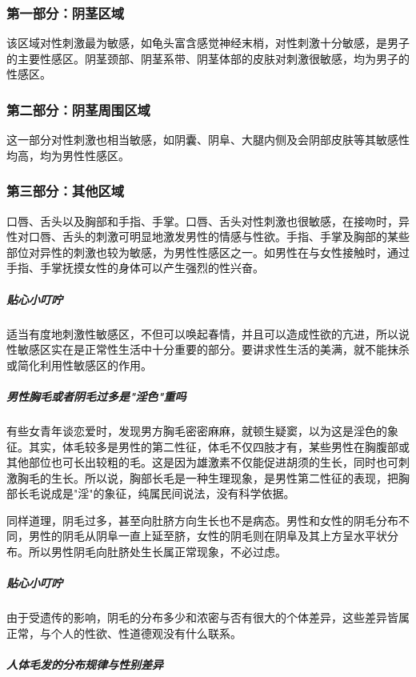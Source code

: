 \begin{enumerate}
\subsubsection{第一部分：阴茎区域}

该区域对性刺激最为敏感，如龟头富含感觉神经末梢，对性刺激十分敏感，是男子的主要性感区。阴茎颈部、阴茎系带、阴茎体部的皮肤对刺激很敏感，均为男子的性感区。

\subsubsection{第二部分：阴茎周围区域}

这一部分对性刺激也相当敏感，如阴囊、阴阜、大腿内侧及会阴部皮肤等其敏感性均高，均为男性性感区。

\subsubsection{第三部分：其他区域}

口唇、舌头以及胸部和手指、手掌。口唇、舌头对性刺激也很敏感，在接吻时，异性对口唇、舌头的刺激可明显地激发男性的情感与性欲。手指、手掌及胸部的某些部位对异性的刺激也较为敏感，为男性性感区之一。如男性在与女性接触时，通过手指、手掌抚摸女性的身体可以产生强烈的性兴奋。

\subparagraph{贴心小叮咛}

适当有度地刺激性敏感区，不但可以唤起春情，并且可以造成性欲的亢进，所以说性敏感区实在是正常性生活中十分重要的部分。要讲求性生活的美满，就不能抹杀或简化利用性敏感区的作用。

\subparagraph{男性胸毛或者阴毛过多是"淫色"重吗}

有些女青年谈恋爱时，发现男方胸毛密密麻麻，就顿生疑窦，以为这是淫色的象征。其实，体毛较多是男性的第二性征，体毛不仅四肢才有，某些男性在胸腹部或其他部位也可长出较粗的毛。这是因为雄激素不仅能促进胡须的生长，同时也可刺激胸毛的生长。所以说，胸部长毛是一种生理现象，是男性第二性征的表现，把胸部长毛说成是"淫"的象征，纯属民间说法，没有科学依据。

同样道理，阴毛过多，甚至向肚脐方向生长也不是病态。男性和女性的阴毛分布不同，男性的阴毛从阴阜一直上延至脐，女性的阴毛则在阴阜及其上方呈水平状分布。所以男性阴毛向肚脐处生长属正常现象，不必过虑。

\subparagraph{贴心小叮咛}

由于受遗传的影响，阴毛的分布多少和浓密与否有很大的个体差异，这些差异皆属正常，与个人的性欲、性道德观没有什么联系。

\subparagraph{人体毛发的分布规律与性别差异}


\end{enumerate}
